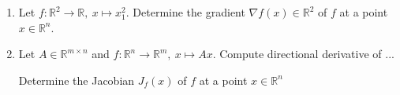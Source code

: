 \vspace*{-0.5cm}
\begin{enumerate}
\item Let $f : \mathbb{R}^{2} \to \mathbb{R},~ x \mapsto x^2_1 $. Determine the gradient $\nabla f(x) \in \mathbb{R}^2$ of $f$ at a point $x \in\mathbb{R}^{n}$.
	\item Let $A\in \mathbb{R}^{m \times n}$ and $f : \mathbb{R}^{n} \to \mathbb{R}^m, ~x \mapsto Ax $. Compute directional derivative of ...
	
	 Determine the Jacobian $J_f(x)$ of $f$ at a point $x \in\mathbb{R}^{n}$
\end{enumerate}
 